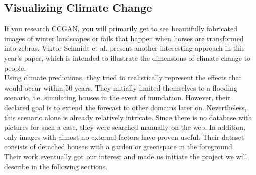     \subsection{Visualizing Climate Change}
        If you research CCGAN, you will primarily get to see beautifully fabricated images of winter landscapes or fails that happen when horses are transformed into zebras. Viktor Schmidt et al. \cite{schmidt2019visualizing} present another interesting approach in this year's paper, which is intended to illustrate the dimensions of climate change to people.\\
        Using climate predictions, they tried to realistically represent the effects that would occur within 50 years. They initially limited themselves to a flooding scenario, i.e. simulating houses in the event of inundation. However, their declared goal is to extend the forecast to other domains later on. Nevertheless, this scenario alone is already relatively intricate. Since there is no database with pictures for such a case, they were searched manually on the web. In addition, only images with almost no external factors have proven useful. Their dataset consists of detached houses with a garden or greenspace in the foreground. \\
        Their work eventually got our interest and made us initiate the project we will describe in the following sections.